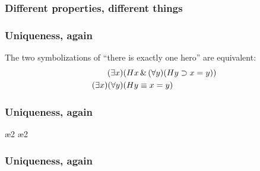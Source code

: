 \begin{frame}
  \frametitle{Different properties, different things}

  \begin{fitchproof}
    \open
    \close
  \end{fitchproof}
\end{frame}

\begin{frame}
  \frametitle{Uniqueness, again}

  The two symbolizations  of ``there is exactly one hero'' are equivalent:
  \begin{align*}
    (\exists x)&(Hx \,\&\, (\forall y)(Hy \supset x = y))\\
    (\exists x)(\forall y) & (Hy \equiv x=y)
  \end{align*}
\end{frame}

\begin{frame}
  \frametitle{Uniqueness, again}
  \tiny
  \begin{fitchproof}
    \open
    \open
    \ae{2}
    \close
    \open
    \ae{2}
    \close
    \close
  \end{fitchproof}
\end{frame}

\begin{frame}
  \frametitle{Uniqueness, again}
\tiny
  \begin{fitchproof}
    \open
    \ii{}
    \open
    \close
    \close
  \end{fitchproof}
\end{frame}

